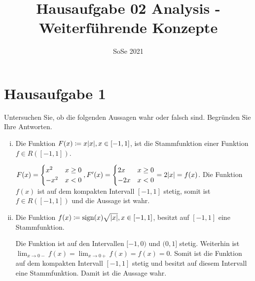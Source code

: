 \documentclass{article}
\author{}
\date{SoSe 2021}
\title{Hausaufgabe 02 Analysis - Weiterführende Konzepte}
\begin{document}
\section*{Hausaufgabe 1}

Untersuchen Sie, ob die folgenden Aussagen wahr oder falsch sind.
Begründen Sie Ihre Antworten.

\begin{enumerate}[(i)]
\item Die Funktion $F(x) \coloneqq x\abs{x}, x \in [-1,1]$, ist die Stammfunktion einer
  Funktion $f \in R([-1, 1])$.

  \label{dia:1.1}

  $F(x) = \begin{cases}
    x^2 & x \geq 0 \\
    - x^2 & x < 0 \\
  \end{cases}, F'(x) = \begin{cases}
    2x & x \geq 0 \\
    -2x & x < 0 \\
  \end{cases} = 2 \abs{x} = f(x)$.
  Die Funktion $f(x)$ ist auf dem kompakten Intervall $[-1, 1]$ stetig, somit ist
  $f \in R([-1, 1])$ und die Aussage ist wahr.
  
\item Die Funktion $f(x) \coloneqq \text{sign}(x) \sqrt{\abs{x}}, x \in [-1,1]$, besitzt
  auf $[-1,1]$ eine Stammfunktion.

  \label{dia:1.2}

  Die Funktion ist auf den Intervallen $[-1, 0)$ und $(0, 1]$ stetig.
  Weiterhin ist $\lim_{x \to 0-} f(x) = \lim_{x \to 0+} f(x) = f(x) = 0$.
  Somit ist die Funktion auf dem kompakten Intervall $[-1, 1]$ stetig und
  besitzt auf diesem Intervall eine Stammfunktion.
  Damit ist die Aussage wahr.
  

\end{enumerate}
\end{document}

